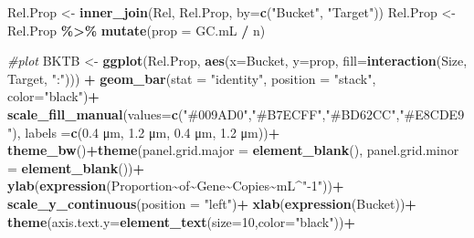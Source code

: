 \documentclass[
]{article}
\newenvironment{Shaded}{\begin{snugshade}}{\end{snugshade}}
\newcommand{\AttributeTok}[1]{\textcolor[rgb]{0.13,0.29,0.53}{#1}}
\newcommand{\CommentTok}[1]{\textcolor[rgb]{0.56,0.35,0.01}{\textit{#1}}}
\newcommand{\DecValTok}[1]{\textcolor[rgb]{0.00,0.00,0.81}{#1}}
\newcommand{\FunctionTok}[1]{\textcolor[rgb]{0.13,0.29,0.53}{\textbf{#1}}}
\newcommand{\NormalTok}[1]{#1}
\newcommand{\OtherTok}[1]{\textcolor[rgb]{0.56,0.35,0.01}{#1}}
\newcommand{\SpecialCharTok}[1]{\textcolor[rgb]{0.81,0.36,0.00}{\textbf{#1}}}
\newcommand{\StringTok}[1]{\textcolor[rgb]{0.31,0.60,0.02}{#1}}
\begin{document}
\begin{Shaded}
\begin{Highlighting}[]
\NormalTok{Rel.Prop }\OtherTok{\textless{}{-}} \FunctionTok{inner\_join}\NormalTok{(Rel, Rel.Prop, }\AttributeTok{by=}\FunctionTok{c}\NormalTok{(}\StringTok{"Bucket"}\NormalTok{, }\StringTok{"Target"}\NormalTok{))}
\NormalTok{Rel.Prop }\OtherTok{\textless{}{-}}\NormalTok{ Rel.Prop }\SpecialCharTok{\%\textgreater{}\%} \FunctionTok{mutate}\NormalTok{(}\AttributeTok{prop =}\NormalTok{ GC.mL }\SpecialCharTok{/}\NormalTok{ n)}

\CommentTok{\#plot}
\NormalTok{BKTB }\OtherTok{\textless{}{-}} \FunctionTok{ggplot}\NormalTok{(Rel.Prop, }\FunctionTok{aes}\NormalTok{(}\AttributeTok{x=}\NormalTok{Bucket, }\AttributeTok{y=}\NormalTok{prop, }\AttributeTok{fill=}\FunctionTok{interaction}\NormalTok{(Size, Target, }\StringTok{":"}\NormalTok{))) }\SpecialCharTok{+} 
  \FunctionTok{geom\_bar}\NormalTok{(}\AttributeTok{stat =} \StringTok{"identity"}\NormalTok{, }\AttributeTok{position =} \StringTok{"stack"}\NormalTok{, }\AttributeTok{color=}\StringTok{"black"}\NormalTok{)}\SpecialCharTok{+}
  \FunctionTok{scale\_fill\_manual}\NormalTok{(}\AttributeTok{values=}\FunctionTok{c}\NormalTok{(}\StringTok{"\#009AD0"}\NormalTok{,}\StringTok{"\#B7ECFF"}\NormalTok{,}\StringTok{"\#BD62CC"}\NormalTok{,}\StringTok{"\#E8CDE9"}\NormalTok{), }\AttributeTok{labels =}\FunctionTok{c}\NormalTok{(}\StringTok{\textquotesingle{}0.4 μm\textquotesingle{}}\NormalTok{, }\StringTok{\textquotesingle{}1.2 μm\textquotesingle{}}\NormalTok{, }\StringTok{\textquotesingle{}0.4 μm\textquotesingle{}}\NormalTok{, }\StringTok{\textquotesingle{}1.2 μm\textquotesingle{}}\NormalTok{))}\SpecialCharTok{+}
  \FunctionTok{theme\_bw}\NormalTok{()}\SpecialCharTok{+}\FunctionTok{theme}\NormalTok{(}\AttributeTok{panel.grid.major =} \FunctionTok{element\_blank}\NormalTok{(), }\AttributeTok{panel.grid.minor =} \FunctionTok{element\_blank}\NormalTok{())}\SpecialCharTok{+}
  \FunctionTok{ylab}\NormalTok{(}\FunctionTok{expression}\NormalTok{(Proportion}\SpecialCharTok{\textasciitilde{}}\NormalTok{of}\SpecialCharTok{\textasciitilde{}}\NormalTok{Gene}\SpecialCharTok{\textasciitilde{}}\NormalTok{Copies}\SpecialCharTok{\textasciitilde{}}\NormalTok{mL}\SpecialCharTok{\^{}}\StringTok{"{-}1"}\NormalTok{))}\SpecialCharTok{+}
  \FunctionTok{scale\_y\_continuous}\NormalTok{(}\AttributeTok{position =} \StringTok{"left"}\NormalTok{)}\SpecialCharTok{+}
  \FunctionTok{xlab}\NormalTok{(}\FunctionTok{expression}\NormalTok{(Bucket))}\SpecialCharTok{+}
  \FunctionTok{theme}\NormalTok{(}\AttributeTok{axis.text.y=}\FunctionTok{element\_text}\NormalTok{(}\AttributeTok{size=}\DecValTok{10}\NormalTok{,}\AttributeTok{color=}\StringTok{"black"}\NormalTok{))}\SpecialCharTok{+}

\end{Highlighting}
\end{Shaded}
\end{document}
